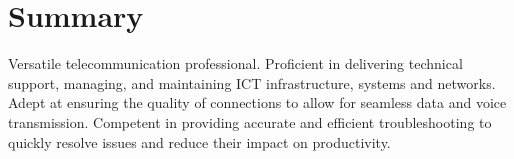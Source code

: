 \section*{Summary}


\qquad Versatile telecommunication professional. Proficient in delivering technical support, managing, and maintaining ICT infrastructure, systems and networks. Adept at ensuring the quality of connections to allow for seamless data and voice transmission. Competent in providing accurate and efficient troubleshooting to quickly resolve issues and reduce their impact on productivity.